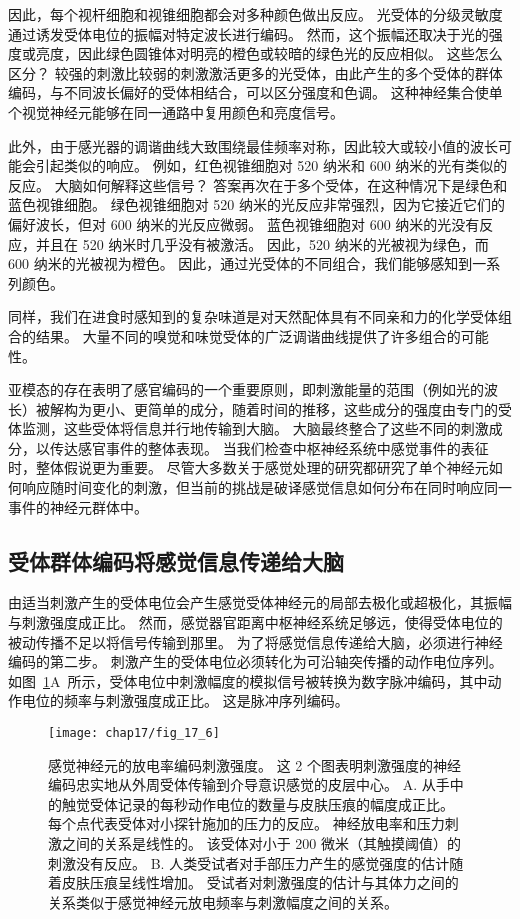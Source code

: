 因此，每个视杆细胞和视锥细胞都会对多种颜色做出反应。 
光受体的分级灵敏度通过诱发受体电位的振幅对特定波长进行编码。 
然而，这个振幅还取决于光的强度或亮度，因此绿色圆锥体对明亮的橙色或较暗的绿色光的反应相似。 
这些怎么区分？ 
较强的刺激比较弱的刺激激活更多的光受体，由此产生的多个受体的群体编码，与不同波长偏好的受体相结合，可以区分强度和色调。 
这种神经集合使单个视觉神经元能够在同一通路中复用颜色和亮度信号。


此外，由于感光器的调谐曲线大致围绕最佳频率对称，因此较大或较小值的波长可能会引起类似的响应。 
例如，红色视锥细胞对 520 纳米和 600 纳米的光有类似的反应。
大脑如何解释这些信号？
答案再次在于多个受体，在这种情况下是绿色和蓝色视锥细胞。
绿色视锥细胞对 520 纳米的光反应非常强烈，因为它接近它们的偏好波长，但对 600 纳米的光反应微弱。
蓝色视锥细胞对 600 纳米的光没有反应，并且在 520 纳米时几乎没有被激活。
因此，520 纳米的光被视为绿色，而 600 纳米的光被视为橙色。
因此，通过光受体的不同组合，我们能够感知到一系列颜色。


同样，我们在进食时感知到的复杂味道是对天然配体具有不同亲和力的化学受体组合的结果。 
大量不同的嗅觉和味觉受体的广泛调谐曲线提供了许多组合的可能性。


亚模态的存在表明了感官编码的一个重要原则，即刺激能量的范围（例如光的波长）被解构为更小、更简单的成分，随着时间的推移，这些成分的强度由专门的受体监测，这些受体将信息并行地传输到大脑。
大脑最终整合了这些不同的刺激成分，以传达感官事件的整体表现。 
当我们检查中枢神经系统中感觉事件的表征时，整体假说更为重要。 
尽管大多数关于感觉处理的研究都研究了单个神经元如何响应随时间变化的刺激，但当前的挑战是破译感觉信息如何分布在同时响应同一事件的神经元群体中。


\subsection{受体群体编码将感觉信息传递给大脑}

由适当刺激产生的受体电位会产生感觉受体神经元的局部去极化或超极化，其振幅与刺激强度成正比。
然而，感觉器官距离中枢神经系统足够远，使得受体电位的被动传播不足以将信号传输到那里。
为了将感觉信息传递给大脑，必须进行神经编码的第二步。
刺激产生的受体电位必须转化为可沿轴突传播的动作电位序列。
如图~\ref{fig:17_6}A~所示，受体电位中刺激幅度的模拟信号被转换为数字脉冲编码，其中动作电位的频率与刺激强度成正比。
这是脉冲序列编码。


\begin{figure}[htbp]
	\centering
	\texttt{[image: chap17/fig\_17\_6]}
	\caption{感觉神经元的放电率编码刺激强度。 
		这 2 个图表明刺激强度的神经编码忠实地从外周受体传输到介导意识感觉的皮层中心\cite{mountcastle1966neural}。
		A. 从手中的触觉受体记录的每秒动作电位的数量与皮肤压痕的幅度成正比。 
		每个点代表受体对小探针施加的压力的反应。 
		神经放电率和压力刺激之间的关系是线性的。 
		该受体对小于 200 微米（其触摸阈值）的刺激没有反应。 
		B. 人类受试者对手部压力产生的感觉强度的估计随着皮肤压痕呈线性增加。 
		受试者对刺激强度的估计与其体力之间的关系类似于感觉神经元放电频率与刺激幅度之间的关系。}
	\label{fig:17_6}
\end{figure}



